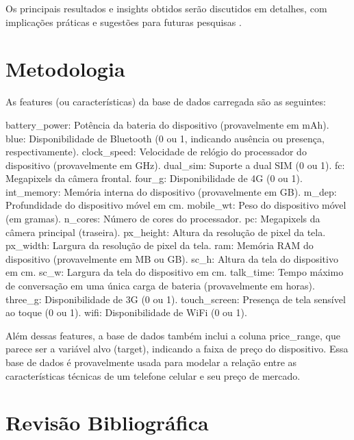 \documentclass[conference]{IEEEtran}
\begin{document}
Os principais resultados e insights obtidos serão discutidos em detalhes, 
com implicações práticas e sugestões para futuras pesquisas \cite{Jurafsky2020}.

\section{Metodologia}


As features (ou características) da base de dados carregada são as seguintes:

    battery_power: Potência da bateria do dispositivo (provavelmente em mAh).
    blue: Disponibilidade de Bluetooth (0 ou 1, indicando ausência ou presença, respectivamente).
    clock_speed: Velocidade de relógio do processador do dispositivo (provavelmente em GHz).
    dual_sim: Suporte a dual SIM (0 ou 1).
    fc: Megapixels da câmera frontal.
    four_g: Disponibilidade de 4G (0 ou 1).
    int_memory: Memória interna do dispositivo (provavelmente em GB).
    m_dep: Profundidade do dispositivo móvel em cm.
    mobile_wt: Peso do dispositivo móvel (em gramas).
    n_cores: Número de cores do processador.
    pc: Megapixels da câmera principal (traseira).
    px_height: Altura da resolução de pixel da tela.
    px_width: Largura da resolução de pixel da tela.
    ram: Memória RAM do dispositivo (provavelmente em MB ou GB).
    sc_h: Altura da tela do dispositivo em cm.
    sc_w: Largura da tela do dispositivo em cm.
    talk_time: Tempo máximo de conversação em uma única carga de bateria (provavelmente em horas).
    three_g: Disponibilidade de 3G (0 ou 1).
    touch_screen: Presença de tela sensível ao toque (0 ou 1).
    wifi: Disponibilidade de WiFi (0 ou 1).

Além dessas features, a base de dados também inclui a coluna price_range, que parece ser a variável alvo (target), indicando a faixa de preço do dispositivo. Essa base de dados é provavelmente usada para modelar a relação entre as características técnicas de um telefone celular e seu preço de mercado. ​
​




\section{Revisão Bibliográfica}
\end{document}
